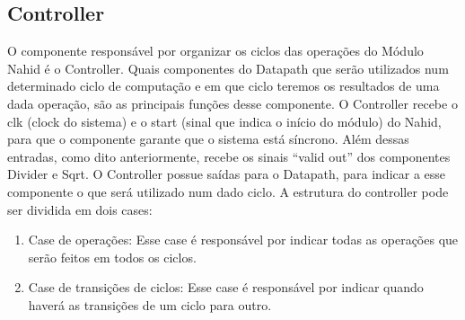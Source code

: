 \subsection{Controller}
O componente responsável por organizar os ciclos das operações do Módulo Nahid é o Controller. Quais componentes do Datapath que serão utilizados num determinado ciclo de computação e em que ciclo teremos os resultados de uma dada operação, são as principais funções desse componente. O Controller recebe o clk (clock do sistema) e o start (sinal que indica o início do módulo) do Nahid, para que o componente garante que o sistema está síncrono. Além dessas entradas, como dito anteriormente, recebe os sinais “valid out” dos componentes Divider e Sqrt. O Controller possue saídas para o Datapath, para indicar a esse componente o que será utilizado num dado ciclo. A estrutura do controller pode ser dividida em dois cases:
\begin{enumerate}
\item Case de operações: Esse case é responsável por indicar todas as operações que serão feitos em todos os ciclos. 
\item Case de transições de ciclos: Esse case é responsável por indicar quando haverá as transições de um ciclo para outro.
\end{enumerate} 